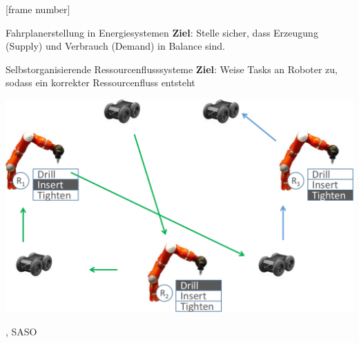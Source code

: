 

{

[frame number]{}



\begin{frame}{Fahrplanerstellung in Energiesystemen}
\textbf{Ziel}: Stelle sicher, dass \alert{Erzeugung} (Supply) und \alert{Verbrauch} (Demand) in Balance sind.

\end{frame}
}


\begin{frame}{Selbstorganisierende Ressourcenflusssysteme}
\textbf{Ziel}: Weise Tasks an Roboter zu, sodass ein korrekter \alert{Ressourcenfluss} entsteht
\begin{center}
\includegraphics[width=.7\textwidth]{img/produktionszelle.pdf}
\end{center}

\hfill \cite{seebach2010software}, SASO

\end{frame}

%
%


